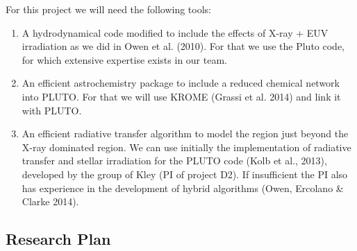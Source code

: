 \documentclass[10pt,fleqn,twoside]{article}
\begin{document}
For this project we will need the following tools: 
\begin{enumerate}
\item A hydrodynamical code modified to include the
  effects of X-ray + EUV irradiation as we did in Owen et al. (2010). For
  that we use the Pluto code, for which extensive expertise
  exists in our team. 
\item An efficient astrochemistry package to include a reduced
  chemical network into PLUTO. For that we will use KROME (Grassi et
  al. 2014) and link it with PLUTO. 
\item An efficient radiative transfer algorithm to model the region
  just beyond the X-ray dominated region. We can use initially the
  implementation of radiative transfer and stellar irradiation
for the PLUTO code (Kolb et al., 2013), developed by the group of Kley
(PI of project D2). If insufficient the PI also has experience in the
development of hybrid algorithms  (Owen, Ercolano \& Clarke 2014). 

\end{enumerate}

\subsection{Research Plan} 

\end{document}
